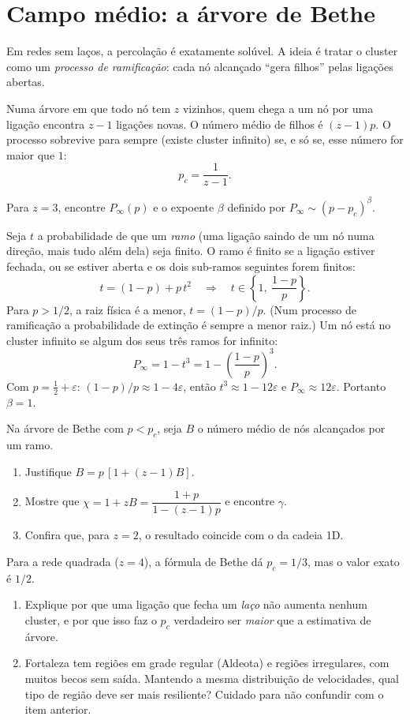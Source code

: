\documentclass[11pt]{article}
\begin{document}
\section{Campo médio: a árvore de Bethe}

Em redes sem laços, a percolação é exatamente solúvel. A ideia é tratar o cluster como um \emph{processo de ramificação}: cada nó alcançado ``gera filhos'' pelas ligações abertas.

\begin{ideia}
Numa árvore em que todo nó tem $z$ vizinhos, quem chega a um nó por uma ligação encontra $z-1$ ligações novas. O número médio de filhos é $(z-1)p$. O processo sobrevive para sempre (existe cluster infinito) se, e só se, esse número for maior que $1$:
\[
p_c = \frac{1}{z-1}.
\]
\end{ideia}

\begin{exemplo}
Para $z=3$, encontre $P_\infty(p)$ e o expoente $\beta$ definido por $P_\infty \sim (p-p_c)^\beta$.
\end{exemplo}
\begin{solucao}
Seja $t$ a probabilidade de que um \emph{ramo} (uma ligação saindo de um nó numa direção, mais tudo além dela) seja finito. O ramo é finito se a ligação estiver fechada, ou se estiver aberta e os dois sub-ramos seguintes forem finitos:
\[
t = (1-p) + p\,t^2 \quad\Longrightarrow\quad t \in \left\{1,\ \frac{1-p}{p}\right\}.
\]
Para $p>1/2$, a raiz física é a menor, $t = (1-p)/p$. (Num processo de ramificação a probabilidade de extinção é sempre a menor raiz.) Um nó está no cluster infinito se algum dos seus três ramos for infinito:
\[
P_\infty = 1 - t^3 = 1 - \left(\frac{1-p}{p}\right)^3.
\]
Com $p = \tfrac12+\varepsilon$: $(1-p)/p \approx 1-4\varepsilon$, então $t^3 \approx 1-12\varepsilon$ e $P_\infty\approx 12\varepsilon$. Portanto $\beta=1$.
\end{solucao}

 Na árvore de Bethe com $p<p_c$, seja $B$ o número médio de nós alcançados por um ramo.
\begin{enumerate}
  \item Justifique $B = p\,[1+(z-1)B]$.
  \item Mostre que $\chi = 1 + zB = \dfrac{1+p}{1-(z-1)p}$ e encontre $\gamma$.
  \item Confira que, para $z=2$, o resultado coincide com o da cadeia 1D.
\end{enumerate}

 Para a rede quadrada ($z=4$), a fórmula de Bethe dá $p_c = 1/3$, mas o valor exato é $1/2$.
\begin{enumerate}
  \item Explique por que uma ligação que fecha um \emph{laço} não aumenta nenhum cluster, e por que isso faz o $p_c$ verdadeiro ser \emph{maior} que a estimativa de árvore.
  \item Fortaleza tem regiões em grade regular (Aldeota) e regiões irregulares, com muitos becos sem saída. Mantendo a mesma distribuição de velocidades, qual tipo de região deve ser mais resiliente? Cuidado para não confundir com o item anterior.
\end{enumerate}
\end{document}
